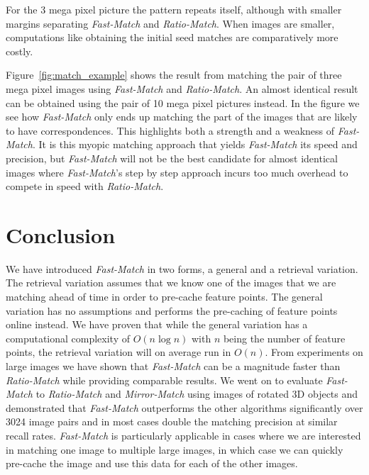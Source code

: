 \documentclass[runningheads]{llncs}
\begin{document}
For the 3 mega pixel picture the pattern repeats itself, although with smaller margins separating \emph{Fast-Match} and \emph{Ratio-Match}. When images are smaller, computations like obtaining the initial seed matches are comparatively more costly.

Figure~\ref{fig:match_example} shows the result from matching the pair of three mega pixel images using \emph{Fast-Match} and \emph{Ratio-Match}. An almost identical result can be obtained using the pair of 10 mega pixel pictures instead. In the figure we see how \emph{Fast-Match} only ends up matching the part of the images that are likely to have correspondences. This highlights both a strength and a weakness of \emph{Fast-Match}. It is this myopic matching approach that yields \emph{Fast-Match} its speed and precision, but \emph{Fast-Match} will not be the best candidate for almost identical images where \emph{Fast-Match}'s step by step approach incurs too much overhead to compete in speed with \emph{Ratio-Match}.

\section{Conclusion}
\label{conclusion}

We have introduced \emph{Fast-Match} in two forms, a general and a retrieval variation. The retrieval variation assumes that we know one of the images that we are matching ahead of time in order to pre-cache feature points. The general variation has no assumptions and performs the pre-caching of feature points online instead. 
We have proven that while the general variation has a computational complexity of $O(n \log n)$ with $n$ being the number of feature points, the retrieval variation will on average run in $O(n)$.
From experiments on large images we have shown that \emph{Fast-Match} can be a magnitude faster than \emph{Ratio-Match} while providing comparable results. We went on to evaluate \emph{Fast-Match} to \emph{Ratio-Match} and \emph{Mirror-Match} using images of rotated 3D objects and demonstrated that \emph{Fast-Match} outperforms the other algorithms significantly over 3024 image pairs and in most cases double the matching precision at similar recall rates.
\emph{Fast-Match} is particularly applicable in cases where we are interested in matching one image to multiple large images, in which case we can quickly pre-cache the image and use this data for each of the other images.



\end{document}
